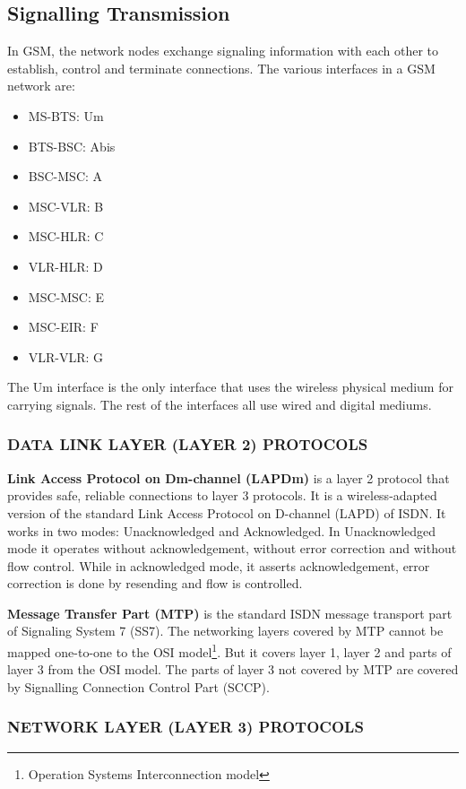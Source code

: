\subsection{Signalling Transmission}
In GSM, the network nodes exchange signaling information with each other to
establish, control and terminate connections.
The various interfaces in a GSM network are:
\begin{itemize}[noitemsep,topsep=0pt,parsep=0pt,partopsep=0pt]
 \item MS-BTS: Um
 \item BTS-BSC: Abis
 \item BSC-MSC: A
 \item MSC-VLR: B
 \item MSC-HLR: C
 \item VLR-HLR: D
 \item MSC-MSC: E
 \item MSC-EIR: F
 \item VLR-VLR: G
\end{itemize}

The Um interface is the only interface that uses the wireless physical medium 
for carrying signals. The rest of the interfaces all use wired and digital 
mediums.

\subsubsection{\uppercase{Data Link Layer (Layer 2) protocols}}

\textbf{Link Access Protocol on Dm-channel (LAPDm)} is a layer 2 protocol that
provides safe, reliable connections to layer 3 protocols. It is a 
wireless-adapted version of 
 the standard Link Access Protocol on D-channel (LAPD) of ISDN. It works in 
 two modes: Unacknowledged and Acknowledged. In Unacknowledged mode it 
 operates without acknowledgement,
 without error correction and without flow control. While in acknowledged 
 mode, it asserts acknowledgement, error correction is done by resending and 
 flow is controlled.
 
 
 \textbf{Message Transfer Part (MTP)} is the standard ISDN message transport 
 part of Signaling System 7 (SS7). The networking layers covered by MTP cannot
 be mapped
 one-to-one to the OSI model\footnote{Operation Systems Interconnection 
 model}. But it covers layer 1, layer 2 and parts of layer 3 from the OSI 
 model. The parts of layer 3
 not covered by MTP are covered by Signalling Connection Control Part (SCCP).

\subsubsection{\uppercase{Network Layer (Layer 3) protocols}}

